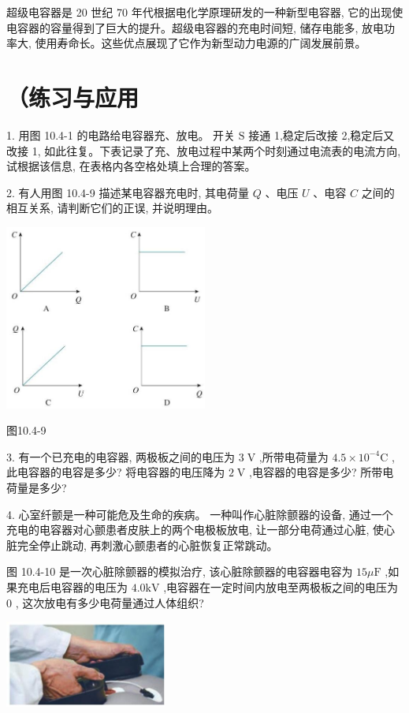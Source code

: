 \documentclass[10pt]{article}
\begin{document}
超级电容器是 20 世纪 70 年代根据电化学原理研发的一种新型电容器, 它的出现使电容器的容量得到了巨大的提升。超级电容器的充电时间短, 储存电能多, 放电功率大, 使用寿命长。这些优点展现了它作为新型动力电源的广阔发展前景。

\section*{（练习与应用}

1. 用图 10.4-1 的电路给电容器充、放电。 开关 \(\mathrm{S}\) 接通 1,稳定后改接 2,稳定后又改接 1, 如此往复。下表记录了充、放电过程中某两个时刻通过电流表的电流方向, 试根据该信息, 在表格内各空格处填上合理的答案。

2. 有人用图 10.4-9 描述某电容器充电时, 其电荷量 \(Q\) 、电压 \(U\) 、电容 \(C\) 之间的相互关系, 请判断它们的正误, 并说明理由。

\begin{center}
\includegraphics[max width=0.5\textwidth]{images/01911d5f-8e38-70c0-b5b8-2b399bd115b6_48_783915.jpg}
\end{center}

图10.4-9

3. 有一个已充电的电容器, 两极板之间的电压为 \(3\mathrm{\;V}\) ,所带电荷量为 \({4.5} \times {10}^{-4}\mathrm{C}\) ,此电容器的电容是多少? 将电容器的电压降为 \(2\mathrm{\;V}\) ,电容器的电容是多少? 所带电荷量是多少?

4. 心室纤颤是一种可能危及生命的疾病。 一种叫作心脏除颤器的设备, 通过一个充电的电容器对心颤患者皮肤上的两个电极板放电, 让一部分电荷通过心脏, 使心脏完全停止跳动, 再刺激心颤患者的心脏恢复正常跳动。

图 10.4-10 是一次心脏除颤器的模拟治疗, 该心脏除颤器的电容器电容为 \({15\mu }\mathrm{F}\) ,如果充电后电容器的电压为 \({4.0}\mathrm{{kV}}\) ,电容器在一定时间内放电至两极板之间的电压为 0 , 这次放电有多少电荷量通过人体组织?

\begin{center}
\includegraphics[max width=0.4\textwidth]{images/01911d5f-8e38-70c0-b5b8-2b399bd115b6_48_726713.jpg}
\end{center}
\end{document}
